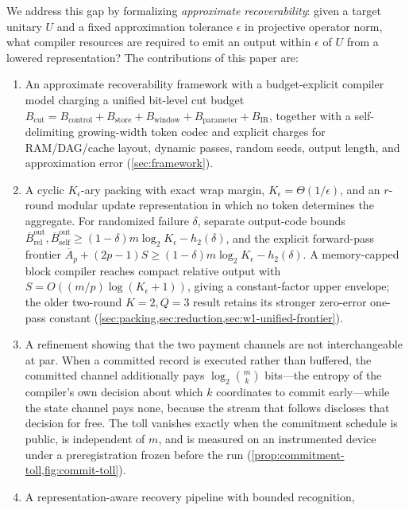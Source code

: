 \documentclass[aps,prx,reprint,floatfix,superscriptaddress]{revtex4-2}
\begin{document}
We address this gap by formalizing \emph{approximate recoverability}:
given a target unitary $U$ and a fixed approximation tolerance $\epsilon$
in projective operator norm, what compiler resources are required to emit
an output within $\epsilon$ of $U$ from a lowered representation? The
contributions of this paper are:
\begin{enumerate}[leftmargin=1.5em]
    \item An approximate recoverability framework with a budget-explicit
    compiler model charging a unified bit-level cut budget
    $B_{\mathrm{cut}}=B_{\mathrm{control}}+B_{\mathrm{store}}+
    B_{\mathrm{window}}+B_{\mathrm{parameter}}+B_{\mathrm{IR}}$, together
    with a self-delimiting growing-width token codec and explicit charges
    for RAM/DAG/cache layout, dynamic passes, random seeds, output length,
    and approximation error
    (\cref{sec:framework}).
    \item A cyclic $K_\epsilon$-ary packing with exact wrap margin,
    $K_\epsilon=\Theta(1/\epsilon)$, and an $r$-round modular update
    representation in which no token determines the aggregate.  For
    randomized failure $\delta$, separate output-code bounds
    $\overline B_{\mathrm{rel}}^{\mathrm{out}},
    \overline B_{\mathrm{self}}^{\mathrm{out}}
    \geq(1-\delta)m\log_2K_\epsilon-h_2(\delta)$, and the explicit
    forward-pass frontier
    $\overline A_p+(2p-1)S\geq
    (1-\delta)m\log_2K_\epsilon-h_2(\delta)$.  A memory-capped block
    compiler reaches compact relative output with
    $S=O((m/p)\log(K_\epsilon+1))$, giving a constant-factor upper
    envelope; the older two-round $K=2,Q=3$ result retains its stronger
    zero-error one-pass constant
    (\cref{sec:packing,sec:reduction,sec:w1-unified-frontier}).
    \item A refinement showing that the two payment channels are not
    interchangeable at par.  When a committed record is executed rather
    than buffered, the committed channel additionally pays
    $\log_2\binom{m}{k}$ bits---the entropy of the compiler's own
    decision about which $k$ coordinates to commit early---while the
    state channel pays none, because the stream that follows discloses
    that decision for free.  The toll vanishes exactly when the
    commitment schedule is public, is independent of $m$, and is
    measured on an instrumented device under a preregistration frozen
    before the run (\cref{prop:commitment-toll,fig:commit-toll}).
    \item A representation-aware recovery pipeline with bounded recognition,

\end{enumerate}
\end{document}
